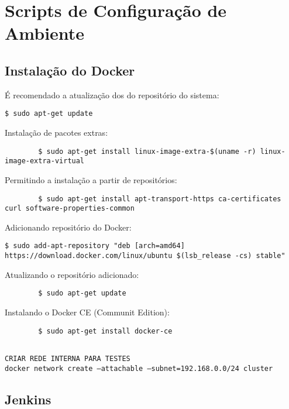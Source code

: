 \appendix

\chapter{Scripts de Configuração de Ambiente}



\section{Instalação do Docker}
\noindent
É recomendado a atualização dos do repositório do sistema:
\begin{verbatim}
$ sudo apt-get update
\end{verbatim}

\noindent
Instalação de pacotes extras:
\begin{verbatim}
		$ sudo apt-get install linux-image-extra-$(uname -r) linux-image-extra-virtual
\end{verbatim}

\noindent
Permitindo a instalação a partir de repositórios:
\begin{verbatim}
		$ sudo apt-get install apt-transport-https ca-certificates curl software-properties-common
\end{verbatim}

\noindent
Adicionando repositório do Docker:
\begin{verbatim}
$ sudo add-apt-repository "deb [arch=amd64] https://download.docker.com/linux/ubuntu $(lsb_release -cs) stable"
\end{verbatim}

\noindent
Atualizando o repositório adicionado:
\begin{verbatim}
		$ sudo apt-get update
\end{verbatim}

\noindent
Instalando o Docker CE (Communit Edition):
\begin{verbatim}
		$ sudo apt-get install docker-ce
\end{verbatim}


\begin{verbatim}

CRIAR REDE INTERNA PARA TESTES
docker network create –attachable –subnet=192.168.0.0/24 cluster
\end{verbatim}


\section{Jenkins}



